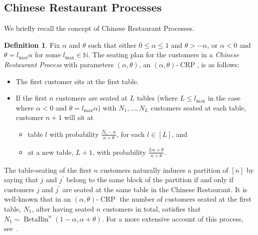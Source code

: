 \documentclass[a4paper, final]{amsart}
\theoremstyle{plain}
\theoremstyle{definition}
\newtheorem{defi}[thm]{Definition}
\DeclareMathOperator{\crp}{CRP}
\DeclareMathOperator{\betabin}{BetaBin}
\newcommand{\N}{\mathbb{N}}
\begin{document}
\subsection{Chinese Restaurant Processes}\label{sec:chineserest}
%
We briefly recall the concept of Chinese Restaurant Processes.
%
\begin{defi}
  Fix $\alpha$ and $\theta$ such that either $0 \leq \alpha \leq 1$ and $\theta > -\alpha$, or $\alpha < 0$ and $\theta = l_\text{max}\alpha$ for some $l_\text{max} \in \N$.
  The seating plan for the customers in a \textit{Chinese Restaurant Process} with parameters $(\alpha, \theta)$, an $(\alpha,\theta)$-$\crp$, is as follows:
%
  \begin{itemize}
    \item The first customer sits at the first table.
    \item If the first $n$ customers are seated at $L$ tables (where $L \leq l_\text{max}$ in the case where $\alpha < 0$ and $\theta = l_\text{max} \alpha$) with $N_1, \ldots, N_L$ customers seated at each table, customer $n+1$ will sit at
      \begin{itemize}
        \item table $l$ with probability $\frac{N_l - \alpha}{n + \theta}$, for each $l \in [L]$, and
        \item at a new table, $L+1$, with probability $\frac{L\alpha + \theta}{n + \theta}$.
      \end{itemize}
  \end{itemize}
%
  \label{def:unordered_chinese_restaurants}
\end{defi}
%
The table-seating of the first $n$ customers naturally induces a partition of $[n]$ by saying that $j$ and $j^\prime$ belong to the same block of the partition if and only if customers $j$ and $j^\prime$ are seated at the same table in the Chinese Restaurant.
It is well-known that in an $(\alpha, \theta)$-$\crp$ the number of customers seated at the first table, $N_1$, after having seated $n$ customers in total, satisfies that $N_1 \sim \betabin^n(1-\alpha, \alpha + \theta)$.
For a more extensive account of this process, see~\cite{RefWorks:doc:5b644f76e4b0a3434e490fc8}. \\
\end{document}
